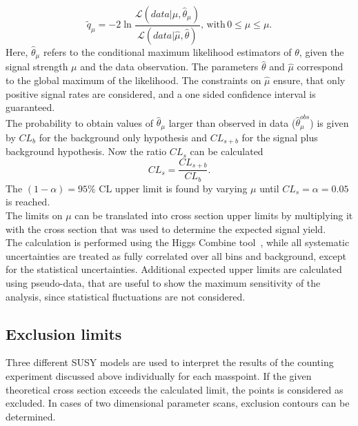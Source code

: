 \begin{equation}
 \tilde{q}_{\mu}= -2 \ln \frac{\mathcal{L}(data|\mu,\hat{\theta}_{\mu})}{\mathcal{L}(data|\hat{\mu},\hat{\theta})}, \,\mathrm{with}\,0\leq\hat{\mu}\leq\mu.
\end{equation}
Here, $\hat{\theta}_{\mu}$ refers to the conditional maximum likelihood estimators of $\theta$, given the signal strength $\mu$ and the data observation. The parameters $\hat{\theta}$ and $\hat{\mu}$ correspond to the global maximum of the likelihood. The constraints on $\hat{\mu}$ ensure, that only positive signal rates are considered, and a one sided confidence interval is guaranteed.\\
The probability to obtain values of $\hat{\theta}_{\mu}$ larger than observed in data ($\hat{\theta}_{\mu}^{obs}$) is given by $CL_b$ for the background only hypothesis and $CL_{s+b}$ for the signal plus background hypothesis. Now the ratio $CL_s$ can be calculated
\begin{equation}
 CL_s=\frac{CL_{s+b}}{CL_b}.
\end{equation}
The $(1-\alpha)=95\%$ CL upper limit is found by varying $\mu$ until $CL_s = \alpha=0.05$ is reached.\\
The limits on $\mu$ can be translated into cross section upper limits by multiplying it with the cross section that was used to determine the expected signal yield.\\
The calculation is performed using the Higgs Combine tool~\cite{CLS3}, while all systematic uncertainties are treated as fully correlated over all bins and background, except for the statistical uncertainties.
Additional expected upper limits are calculated using pseudo-data, that are useful to show the maximum sensitivity of the analysis, since statistical fluctuations are not considered.


\subsection{Exclusion limits}
Three different SUSY models are used to interpret the results of the counting experiment discussed above individually for each masspoint. If the given theoretical cross section exceeds the calculated limit, the points is considered as excluded. In cases of two dimensional parameter scans, exclusion contours can be determined.


